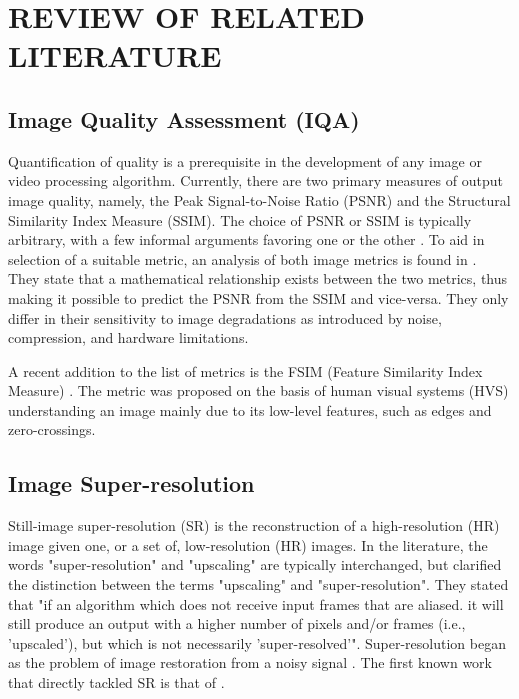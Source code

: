 
\chapter{REVIEW OF RELATED LITERATURE} %

\label{Chapter2} %


\section{Image Quality Assessment (IQA)}
Quantification of quality is a prerequisite in the development of any image or video processing algorithm.
Currently, there are two primary measures of output image quality, namely, the Peak Signal-to-Noise Ratio (PSNR) and the Structural Similarity Index Measure (SSIM). 
The choice of PSNR or SSIM is typically arbitrary, with a few informal arguments favoring one or the other \citep{Farsiu2004}.
To aid in selection of a suitable metric, an analysis of both image metrics is found in \cite{Hore2010}. 
They state that a mathematical relationship exists between the two metrics, thus making it possible to predict the PSNR from the SSIM and vice-versa. 
They only differ in their sensitivity to image degradations as introduced by noise, compression, and hardware limitations.

A recent addition to the list of metrics is the FSIM (Feature Similarity Index Measure) \citep{Zhang2011a}.
The metric was proposed on the basis of human visual systems (HVS) understanding an image mainly due to its low-level features, such as edges and zero-crossings.


\section{Image Super-resolution}

Still-image super-resolution (SR) is the reconstruction of a high-resolution (HR) image given one, or a set of, low-resolution (HR) images. 
In the literature, the words "super-resolution" and "upscaling" are typically interchanged, but \cite{Takeda2009} clarified the distinction between the terms "upscaling" and "super-resolution". 
They stated that "if an algorithm which does not receive input frames that are aliased. it will still produce an output with a higher number of pixels and/or frames (i.e., 'upscaled'), but which is not necessarily 'super-resolved'".
Super-resolution began as the problem of image restoration from a noisy signal \citep{Helstrom1967}.
The first known work that directly tackled SR is that of \cite{tsai1984multiframe}. 

